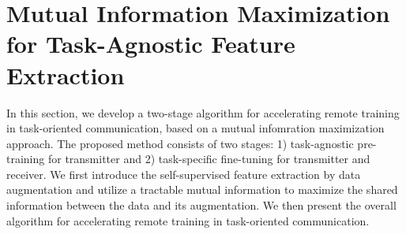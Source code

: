 \section{Mutual Information Maximization for Task-Agnostic Feature Extraction}
\label{sec:method}
In this section, we develop a two-stage algorithm for accelerating remote training in task-oriented communication, based on a mutual infomration maximization approach. The proposed method consists of two stages: 1) task-agnostic pre-training for transmitter and 2) task-specific fine-tuning for transmitter and receiver. We first introduce the self-supervised feature extraction by data augmentation and utilize a tractable mutual information to maximize the shared information between the data and its augmentation. We then present the overall algorithm for accelerating remote training in task-oriented communication.






